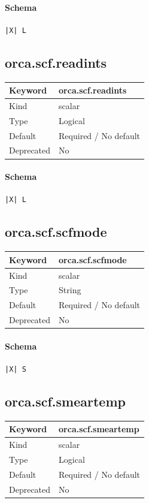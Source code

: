 \documentclass[11pt]{article}
\begin{document}
{{{{{\paragraph{Schema}
\begin{Verbatim}
|X| L
\end{Verbatim}

\subsection{orca.scf.readints}
\label{kw:orca-scf-readints}
\begin{longtable}{|p{1.5in}|p{4.5in}|}
\hline
Keyword & orca.scf.readints \\
\hline
Kind & scalar \\
\hline
Type & Logical \\
\hline
Default & Required / No default \\
\hline
Deprecated & No \\
\hline
\end{longtable}
\paragraph{Schema}
\begin{Verbatim}
|X| L
\end{Verbatim}

\subsection{orca.scf.scfmode}
\label{kw:orca-scf-scfmode}
\begin{longtable}{|p{1.5in}|p{4.5in}|}
\hline
Keyword & orca.scf.scfmode \\
\hline
Kind & scalar \\
\hline
Type & String \\
\hline
Default & Required / No default \\
\hline
Deprecated & No \\
\hline
\end{longtable}
\paragraph{Schema}
\begin{Verbatim}
|X| S
\end{Verbatim}

\subsection{orca.scf.smeartemp}
\label{kw:orca-scf-smeartemp}
\begin{longtable}{|p{1.5in}|p{4.5in}|}
\hline
Keyword & orca.scf.smeartemp \\
\hline
Kind & scalar \\
\hline
Type & Logical \\
\hline
Default & Required / No default \\
\hline
Deprecated & No \\
\hline
\end{longtable}
}}}}}
\end{document}
